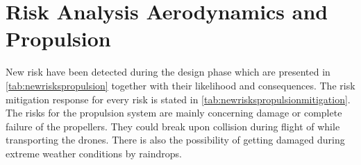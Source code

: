 \begin{table}[H]
\centering
\caption{Iteration table 2 of the propulsion system design}
\label{tab:propiterationdeux}
\end{table}


\section{Risk Analysis Aerodynamics and Propulsion}
\label{sec:propriskanalysis}

New risk have been detected during the design phase which are presented in \autoref{tab:newriskspropulsion} together with their likelihood and consequences. The risk mitigation response for every risk is stated in \autoref{tab:newriskspropulsionmitigation}. The risks for the propulsion system are mainly concerning damage or complete failure of the propellers. They could break upon collision during flight of while transporting the drones. There is also the possibility of getting damaged during extreme weather conditions by raindrops.

